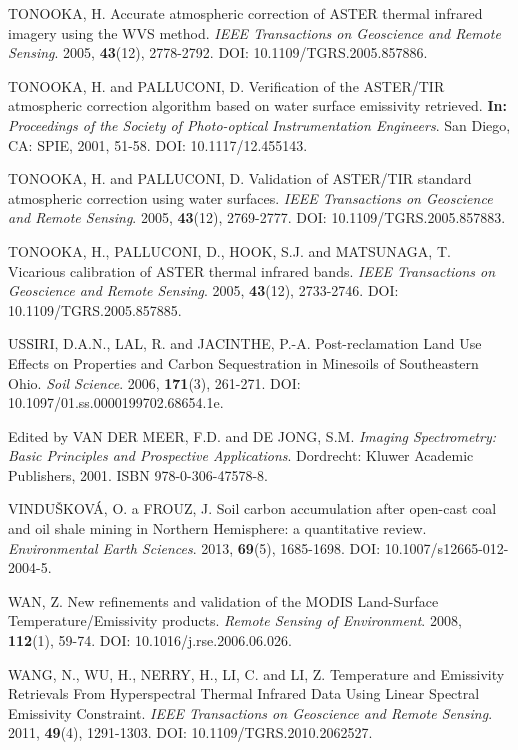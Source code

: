 \begin{thebibliography}{10}
 TONOOKA, H. Accurate atmospheric correction of ASTER thermal infrared imagery using the WVS method. \textit{IEEE Transactions on Geoscience and Remote Sensing}. 2005, \textbf{43}(12), 2778-2792. DOI: 10.1109/TGRS.2005.857886.

 TONOOKA, H. and PALLUCONI, D. Verification of the ASTER/TIR atmospheric correction algorithm based on water surface emissivity retrieved. \textbf{In:} \textit{Proceedings of the Society of Photo-optical Instrumentation Engineers}. San Diego, CA: SPIE, 2001, 51-58. DOI: 10.1117/12.455143.

 TONOOKA, H. and PALLUCONI, D. Validation of ASTER/TIR standard atmospheric correction using water surfaces. \textit{IEEE Transactions on Geoscience and Remote Sensing}. 2005, \textbf{43}(12), 2769-2777. DOI: 10.1109/TGRS.2005.857883.

  TONOOKA, H., PALLUCONI, D., HOOK, S.J. and MATSUNAGA, T. Vicarious calibration of ASTER thermal infrared bands. \textit{IEEE Transactions on Geoscience and Remote Sensing}. 2005, \textbf{43}(12), 2733-2746. DOI: 10.1109/TGRS.2005.857885.

 USSIRI, D.A.N., LAL, R. and JACINTHE, P.-A. Post-reclamation Land Use Effects on Properties and Carbon Sequestration in Minesoils of Southeastern Ohio. \textit{Soil Science}. 2006, \textbf{171}(3), 261-271. DOI: 10.1097/01.ss.0000199702.68654.1e.

 Edited by VAN DER MEER, F.D. and DE JONG, S.M. \textit{Imaging Spectrometry: Basic Principles and Prospective Applications}. Dordrecht: Kluwer Academic Publishers, 2001. ISBN 978-0-306-47578-8.

 VINDUŠKOVÁ, O. a FROUZ, J. Soil carbon accumulation after open-cast coal and oil shale mining in Northern Hemisphere: a quantitative review. \textit{Environmental Earth Sciences}. 2013, \textbf{69}(5), 1685-1698. DOI: 10.1007/s12665-012-2004-5. 

 WAN, Z. New refinements and validation of the MODIS Land-Surface Temperature/Emissivity products. \textit{Remote Sensing of Environment}. 2008, \textbf{112}(1), 59-74. DOI: 10.1016/j.rse.2006.06.026. 

 WANG, N., WU, H., NERRY, H., LI, C. and LI, Z. Temperature and Emissivity Retrievals From Hyperspectral Thermal Infrared Data Using Linear Spectral Emissivity Constraint. \textit{IEEE Transactions on Geoscience and Remote Sensing}. 2011, \textbf{49}(4), 1291-1303. DOI: 10.1109/TGRS.2010.2062527.


\end{thebibliography}
